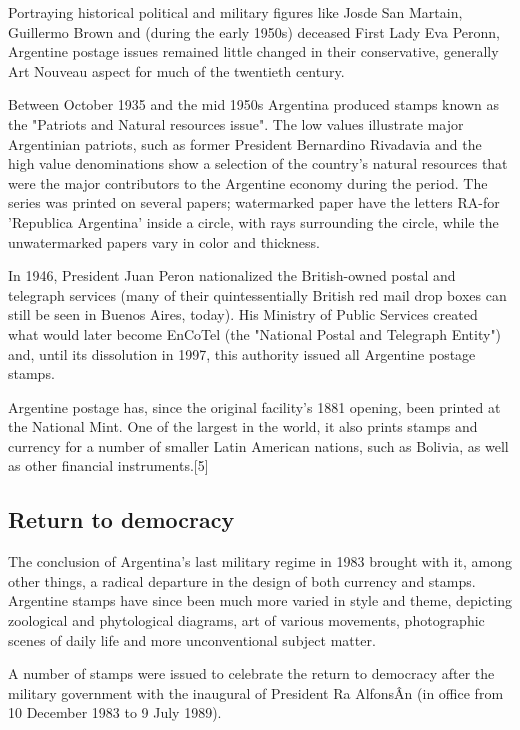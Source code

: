 Portraying historical political and military figures like Jos\e de San Martai­n, Guillermo Brown and (during the early 1950s) deceased First Lady Eva Peronn, Argentine postage issues remained little changed in their conservative, generally Art Nouveau aspect for much of the twentieth century.

Between October 1935 and the mid 1950s Argentina produced stamps known as the "Patriots and Natural resources issue". The low values illustrate major Argentinian patriots, such as former President Bernardino Rivadavia and the high value denominations show a selection of the country's natural resources that were the major contributors to the Argentine economy during the period. The series was printed on several papers; watermarked paper have the letters RA-for 'Republica Argentina' inside a circle, with rays surrounding the circle, while the unwatermarked papers vary in color and thickness.


In 1946, President Juan Peron nationalized the British-owned postal and telegraph services (many of their quintessentially British red mail drop boxes can still be seen in Buenos Aires, today). His Ministry of Public Services created what would later become EnCoTel (the "National Postal and Telegraph Entity") and, until its dissolution in 1997, this authority issued all Argentine postage stamps.

Argentine postage has, since the original facility's 1881 opening, been printed at the National Mint. One of the largest in the world, it also prints stamps and currency for a number of smaller Latin American nations, such as Bolivia, as well as other financial instruments.[5]

\subsection{Return to democracy}

The conclusion of Argentina's last military regime in 1983 brought with it, among other things, a radical departure in the design of both currency and stamps. Argentine stamps have since been much more varied in style and theme, depicting zoological and phytological diagrams, art of various movements, photographic scenes of daily life and more unconventional subject matter.

A number of stamps were issued to celebrate the return to democracy after the military government with the inaugural of President Ra AlfonsÂ­n (in office from 10 December 1983 to 9 July 1989). 

